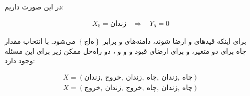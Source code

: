 \documentclass{article}
\begin{document}
\subsection{}
در این صورت داریم: \\
\begin{fleqn}
\begin{equation}
\begin{aligned}
X_{5} = \text{زندان} \:\:\:\: \Rightarrow \:\:\:\:
Y_{5} = 0
\end{aligned}
\end{equation}
\end{fleqn}
برای اینکه قیدهای  و  ارضا شوند، دامنه‌های  و  برابر $\left\{ چاه \right\}$ می‌شود. با انتخاب مقدار چاه برای دو متغیر، و برای ارضای قیود  و  و  و ، دو راه‌حل ممکن زیر برای این مسئله وجود دارد: \\
\begin{fleqn}
\begin{equation}
\begin{aligned}
X = \left( \text{زندان}, \: \text{خروج}, \: \text{زندان}, \: \text{چاه}, \: \text{زندان}, \: \text{چاه} \right) \\
X = \left( \text{خروج}, \: \text{زندان}, \: \text{خروج}, \: \text{چاه}, \: \text{زندان}, \: \text{چاه} \right) \\
\end{aligned}
\end{equation}
\end{fleqn}

\subsection{}
\subsection{}
\end{document}
